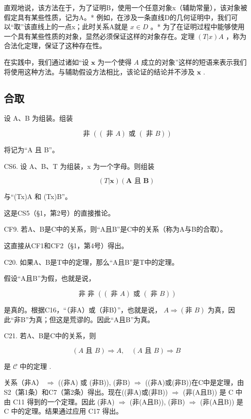 直观地说，该方法在于，为了证明B，使用一个任意对象x（辅助常量），该对象被假定具有某些性质，记为A。* 例如，在涉及一条直线D的几何证明中，我们可以“取”该直线上的一点x；此时关系A就是 \(x \in D\) 。* 为了在证明过程中能够使用一个具有某些性质的对象，显然必须保证这样的对象存在。定理 \((T|x)A\) ，称为合法化定理，保证了这种存在性。

在实践中，我们通过诸如“设 \(\pmb{x}\) 为一个使得 \(A\) 成立的对象”这样的短语来表示我们将使用这种方法。与辅助假设方法相比，该论证的结论并不涉及 \(\pmb{x}\) .

\subsection{合取}

设 A、B 为组装。组装

\[
\text { 非 } ((\text { 非 } A) \text { 或 } (\text { 非 } B))
\]

将记为“A 且 B”。

CS6. 设 A、B、T 为组装，x 为一个字母。则组装

\[
(T | \boldsymbol {x}) (\boldsymbol {A} \text { 且 } \boldsymbol {B})
\]

与“(T\textbar x)A 和 (T\textbar x)B''。

这是CS5（§1，第2号）的直接推论。

CF9. 若A、B是C中的关系，则“A且B”是C中的关系（称为A与B的合取）。

这直接从CF1和CF2（§1，第4号）得出。

C20. 如果A、B是T中的定理，那么“A且B”是T中的定理。

假设“A且B”为假，也就是说，

\[
\text { 非   非   } ((\text { 非   } A) \text {   或   } (\text { 非   } B))
\]

是真的。根据C16，“（非A）或（非B）”，也就是说， \(A \Longrightarrow (\text{非 } B)\) 为真，因此“非B”为真；但这是荒谬的。因此“A且B”为真。

C21. 若A、B是C中的关系，则

\[
(A \text {   且   } B) \Longrightarrow A, \quad (A \text {   且   } B) \Longrightarrow B
\]

是 \(\mathcal{C}\) 中的定理 .

关系（非A） \(\Longrightarrow\) ((非A) 或 (非B)), (非B) \(\Longrightarrow\) ((非A)或(非B))在C中是定理，由S2（第1条）和C7（第2条）得出。现在((非A)或(非B)) \(\Longrightarrow\) (非(A且B)) 是 C 中由 C11 得到的一个定理。因此 (非A) \(\Longrightarrow\) (非(A且B)), (非B) \(\Longrightarrow\) (非(A且B)) 是 C 中的定理。结果通过应用 C17 得出。

